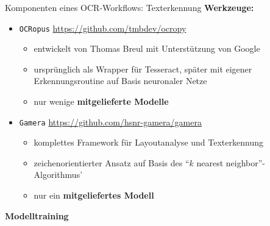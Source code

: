 \documentclass{bbawslides}
\begin{document}
\begin{bbawslide}{Komponenten eines OCR-Workflows: Texterkennung}
  \vspace*{7mm}%
  \centerslidestrue%
  \textbf{Werkzeuge:}
  \begin{itemize}
    \item \texttt{OCRopus} \url{https://github.com/tmbdev/ocropy}
    \begin{itemize}\small
      \item entwickelt von Thomas Breul mit Unterstützung von Google
      \item ursprünglich als Wrapper für Tesseract, später mit eigener Erkennungsroutine auf Basis neuronaler Netze
      \item nur wenige \textbf{mitgelieferte Modelle}
    \end{itemize}
    \item \texttt{Gamera} \url{https://github.com/hsnr-gamera/gamera}
    \begin{itemize}\small
      \item komplettes Framework für Layoutanalyse und Texterkennung
      \item zeichenorientierter Ansatz auf Basis des \enquote{$k$ nearest neighbor}-Algorithmus'
      \item nur ein \textbf{mitgeliefertes Modell}
    \end{itemize}
  \end{itemize}
\end{bbawslide}

\begin{bbawpart}{\Large\bf Modelltraining}
\end{bbawpart}
\end{document}
